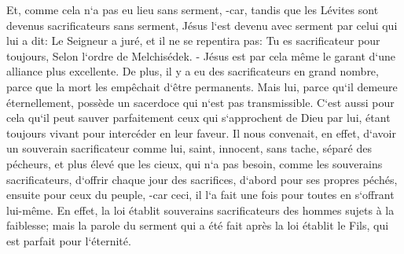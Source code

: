 \verse Et, comme cela n`a pas eu lieu sans serment, 
\verse -car, tandis que les Lévites sont devenus sacrificateurs sans serment, Jésus l`est devenu avec serment par celui qui lui a dit: Le Seigneur a juré, et il ne se repentira pas: Tu es sacrificateur pour toujours, Selon l`ordre de Melchisédek. - 
\verse Jésus est par cela même le garant d`une alliance plus excellente. 
\verse De plus, il y a eu des sacrificateurs en grand nombre, parce que la mort les empêchait d`être permanents. 
\verse Mais lui, parce qu`il demeure éternellement, possède un sacerdoce qui n`est pas transmissible. 
\verse C`est aussi pour cela qu`il peut sauver parfaitement ceux qui s`approchent de Dieu par lui, étant toujours vivant pour intercéder en leur faveur. 
\verse Il nous convenait, en effet, d`avoir un souverain sacrificateur comme lui, saint, innocent, sans tache, séparé des pécheurs, et plus élevé que les cieux, 
\verse qui n`a pas besoin, comme les souverains sacrificateurs, d`offrir chaque jour des sacrifices, d`abord pour ses propres péchés, ensuite pour ceux du peuple, -car ceci, il l`a fait une fois pour toutes en s`offrant lui-même. 
\verse En effet, la loi établit souverains sacrificateurs des hommes sujets à la faiblesse; mais la parole du serment qui a été fait après la loi établit le Fils, qui est parfait pour l`éternité. 

